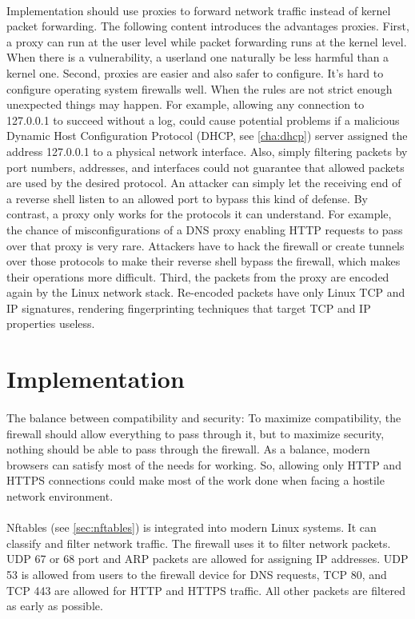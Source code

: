\documentclass[mscthesis]{usiinfthesis}
\begin{document}
\paragraph{}
Implementation should use proxies to forward network traffic instead of kernel packet forwarding. The following content introduces the advantages proxies. First, a proxy can run at the user level while packet forwarding runs at the kernel level. When there is a vulnerability, a userland one naturally be less harmful than a kernel one. Second, proxies are easier and also safer to configure. It's hard to configure operating system firewalls well. When the rules are not strict enough unexpected things may happen. For example, allowing any connection to 127.0.0.1 to succeed without a log, could cause potential problems if a malicious Dynamic Host Configuration Protocol (DHCP, see \cref{cha:dhcp}) server assigned the address 127.0.0.1 to a physical network interface. Also, simply filtering packets by port numbers, addresses, and interfaces could not guarantee that allowed packets are used by the desired protocol. An attacker can simply let the receiving end of a reverse shell listen to an allowed port to bypass this kind of defense. By contrast, a proxy only works for the protocols it can understand. For example, the chance of misconfigurations of a DNS proxy enabling HTTP requests to pass over that proxy is very rare. Attackers have to hack the firewall or create tunnels over those protocols to make their reverse shell bypass the firewall, which makes their operations more difficult. Third, the packets from the proxy are encoded again by the Linux network stack. Re-encoded packets have only Linux TCP and IP signatures, rendering fingerprinting techniques that target TCP and IP properties useless.

\section{Implementation}
\paragraph{}
The balance between compatibility and security: To maximize compatibility, the firewall should allow everything to pass through it, but to maximize security, nothing should be able to pass through the firewall. As a balance, modern browsers can satisfy most of the needs for working. So, allowing only HTTP and HTTPS connections could make most of the work done when facing a hostile network environment.
\paragraph{}
Nftables (see \cref{sec:nftables}) is integrated into modern Linux systems. It can classify and filter network traffic. The firewall uses it to filter network packets. UDP 67 or 68 port and ARP packets are allowed for assigning IP addresses. UDP 53 is allowed from users to the firewall device for DNS requests, TCP 80, and TCP 443 are allowed for HTTP and HTTPS traffic. All other packets are filtered as early as possible.
\end{document}
